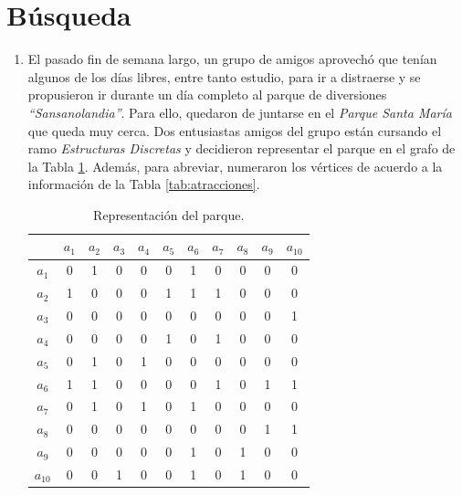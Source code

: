\documentclass[letterpaper,10pt]{article}
\begin{document}
\section{Búsqueda}
\begin{enumerate}
    \item El pasado fin de semana largo, un grupo de amigos aprovechó que tenían algunos de los días libres, entre tanto estudio, para ir a distraerse y se propusieron ir durante un día completo al parque de diversiones \textit{``Sansanolandia''}. Para ello, quedaron de juntarse en el \textit{Parque Santa María} que queda muy cerca. Dos entusiastas amigos del grupo están cursando el ramo \textit{Estructuras Discretas} y decidieron representar el parque en el grafo de la Tabla \ref{tab:parque}. Además, para abreviar, numeraron los vértices de acuerdo a la información de la Tabla \ref{tab:atracciones}. 
    
    \begin{minipage}[h]{0.36\textwidth}
    \small
    \begin{table}[H]
        \begin{center}
            
            \begin{tabular}{c|cccccccccc}
            
             & $a_1$ & $a_2$ & $a_3$ & $a_4$ & $a_5$ & $a_6$ & $a_7$ & $a_8$ & $a_9$ & $a_{10}$\\ \hline
            $a_1$ & 0 & 1 & 0 & 0 & 0 & 1 & 0 & 0 & 0 & 0\\
            $a_2$ & 1 & 0 & 0 & 0 & 1 & 1 & 1 & 0 & 0 & 0\\
            $a_3$ & 0 & 0 & 0 & 0 & 0 & 0 & 0 & 0 & 0 & 1\\
            $a_4$ & 0 & 0 & 0 & 0 & 1 & 0 & 1 & 0 & 0 & 0\\
            $a_5$ & 0 & 1 & 0 & 1 & 0 & 0 & 0 & 0 & 0 & 0\\
            $a_6$ & 1 & 1 & 0 & 0 & 0 & 0 & 1 & 0 & 1 & 1\\
            $a_7$ & 0 & 1 & 0 & 1 & 0 & 1 & 0 & 0 & 0 & 0\\
            $a_8$ & 0 & 0 & 0 & 0 & 0 & 0 & 0 & 0 & 1 & 1\\
            $a_9$ & 0 & 0 & 0 & 0 & 0 & 1 & 0 & 1 & 0 & 0\\
            $a_{10}$ & 0 & 0 & 1 & 0 & 0 & 1 & 0 & 1 & 0 & 0\\
            \end{tabular}
        \caption{Representación del parque.}\label{tab:parque}
        

\end{center}
\end{table}
\end{minipage}
\end{enumerate}
\end{document}
